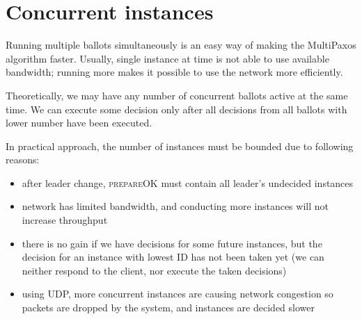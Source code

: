 \section{Concurrent instances}
\label{subsec:concurrent_instances}
Running multiple ballots simultaneously is an easy way of making the MultiPaxos algorithm faster. Usually, single instance at time is not able to use available bandwidth; running more makes it possible to use the network more efficiently.

Theoretically, we may have any number of concurrent ballots active at the same time. We can execute some decision only after all decisions from all ballots with lower number have been executed.

In practical approach, the number of instances must be bounded due to following reasons:
\begin{itemize} 
  \item after leader change, \textsc{prepareOK} must contain all leader's undecided instances
  \item network has limited bandwidth, and conducting more instances will not increase throughput
  \item there is no gain if we have decisions for some future instances, but the decision for an instance with lowest ID has not been taken yet (we can neither respond to the client, nor execute the taken decisions)
  \item using UDP, more concurrent instances are causing network congestion so packets are dropped by the system, and instances are decided slower
\end{itemize}

